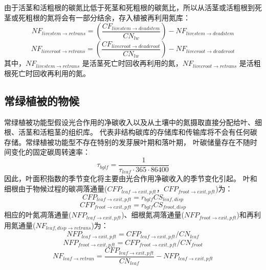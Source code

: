 \begin{enumerate}
由于活茎和活粗根的碳氮比低于死茎和死粗根的碳氮比，所以从活茎或活粗根到死茎或死粗根的氮将会有一部分结余，存入植被再利用氮库：
\begin{equation}
NF_{{livestem\rightarrow retrans}}=\left(\frac{CF_{{livestem\rightarrow deadstem}}}{CN_{lw}}\right)-NF_{{livestem\rightarrow deadstem}}
\end{equation}
\begin{equation}
NF_{{livecroot\rightarrow retrans}}=\left(\frac{CF_{{livecroot\rightarrow deadcroot}}}{CN_{lw}}\right)-NF_{{livecroot\rightarrow deadcroot}}
\end{equation}
其中，$NF_{livestem\rightarrow retrans}$ 是活茎死亡时回收再利用的氮，$NF_{livecroot\rightarrow retrans}$ 是活粗根死亡时回收再利用的氮。

\end{enumerate}


\subsection{常绿植被的物候}\label{常绿植被的物候}
常绿植被功能型假设光合作用的净碳收入以及从土壤中的氮摄取直接分配给叶、细根、活茎和活粗茎的组织库。
代表非结构碳库的存储库和传输库将不会有任何碳存储。常绿植被功能型不存在特别的发芽展叶期和落叶期，
叶碳储量存在不随时间变化的固定碳周转速率：
\begin{equation}
\tau_{bglf}=\frac{1}{\tau_{leaf} \cdot 365 \cdot 86400}
\end{equation}
因此，叶面积指数的季节变化将主要由光合作用净碳收入的季节变化引起。
叶和细根由于物候过程的碳凋落通量($CFP_{leaf\rightarrow exit,pft}$，$CFP_{froot\rightarrow exit,pft}$)为：
\begin{equation}
CFP_{leaf\rightarrow exit,pft}=r_{bglf} CS_{leaf,disp}
\end{equation}
\begin{equation}
CFP_{froot\rightarrow exit,pft}=r_{bglf} CS_{froot,disp}
\end{equation}
相应的叶氮凋落通量($NFP_{leaf\rightarrow exit,pft}$)、细根氮凋落通量($NFP_{froot\rightarrow exit,pft}$)和再利用氮通量($NF_{leaf,disp\rightarrow retrans}$)为：
\begin{equation}
N FP_{leaf\rightarrow exit,pft}=CFP_{leaf\rightarrow exit,pft} / CN_{leaf}
\end{equation}
\begin{equation}
N FP_{froot\rightarrow exit,pft}=CFP_{froot\rightarrow exit,pft} / CN_{froot}
\end{equation}
\begin{equation}
N F_{leaf\rightarrow retran}=\frac{CFP_{leaf\rightarrow exit,pft }}{CN_{leaf}}-NFP_{leaf\rightarrow exit,pft}
\end{equation}


